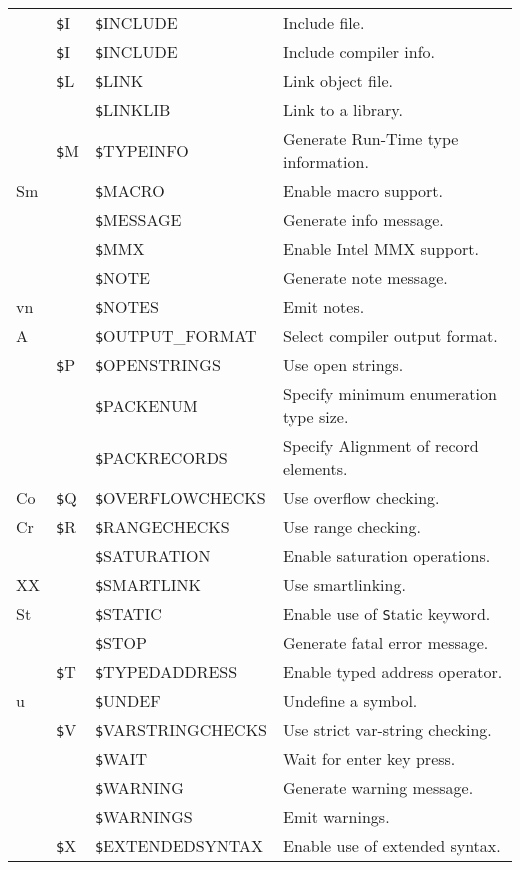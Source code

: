 \documentclass{article}
\newcommand{\var}[1]{{\texttt #1}}
\begin{document}
\begin{tabularx}{\textwidth}{lllX}
&\var{\$I} & \var{\$INCLUDE} & Include file.  \\
&\var{\$I} & \var{\$INCLUDE} & Include compiler info. \\
&\var{\$L} & \var{\$LINK} & Link object file. \\
&& \var{\$LINKLIB} & Link to a library. \\
&\var{\$M} & \var{\$TYPEINFO} & Generate Run-Time type information. \\
Sm && \var{\$MACRO} & Enable macro support. \\
&& \var{\$MESSAGE} & Generate info message. \\
&& \var{\$MMX} & Enable Intel MMX support. \\
&& \var{\$NOTE} & Generate note message. \\
vn && \var{\$NOTES} & Emit notes. \\
A && \var{\$OUTPUT\_FORMAT} & Select compiler output format. \\
&\var{\$P} & \var{\$OPENSTRINGS} & Use open strings. \\
&& \var{\$PACKENUM} & Specify minimum enumeration type size. \\
&& \var{\$PACKRECORDS} & Specify Alignment of record elements. \\
Co &\var{\$Q} & \var{\$OVERFLOWCHECKS}& Use overflow checking. \\
Cr &\var{\$R} & \var{\$RANGECHECKS} & Use range checking. \\
&& \var{\$SATURATION} & Enable saturation operations. \\
XX && \var{\$SMARTLINK} & Use smartlinking. \\
St && \var{\$STATIC} & Enable use of \var{Static} keyword. \\
&& \var{\$STOP} & Generate fatal error message. \\
&\var{\$T} & \var{\$TYPEDADDRESS} & Enable typed address operator. \\
u && \var{\$UNDEF} & Undefine a symbol. \\
&\var{\$V} & \var{\$VARSTRINGCHECKS} & Use strict var-string checking. \\
&& \var{\$WAIT} & Wait for enter key press. \\
&& \var{\$WARNING} & Generate warning message. \\
&& \var{\$WARNINGS} & Emit warnings. \\
&\var{\$X} & \var{\$EXTENDEDSYNTAX} & Enable use of extended syntax. \\ \hline
\end{tabularx}
\end{document}
